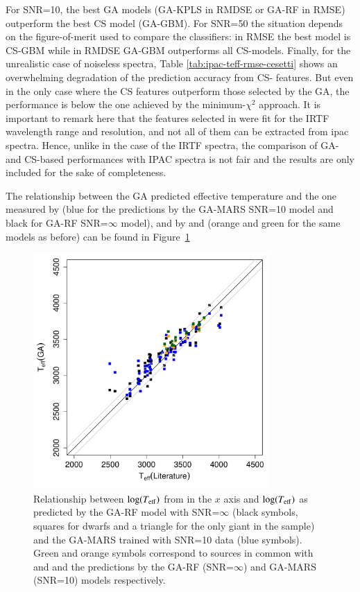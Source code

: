 For SNR=10, the best GA models (GA-KPLS in RMDSE or GA-RF in RMSE)
outperform the best CS model (GA-GBM). For SNR=50 the situation
depends on the figure-of-merit used to compare the classifiers: in
RMSE the best model is CS-GBM while in RMDSE GA-GBM outperforms all
CS-models. Finally, for the unrealistic case of noiseless spectra,
Table \ref{tab:ipac-teff-rmse-cesetti} shows an overwhelming
degradation of the prediction accuracy from CS- features. But even in
the only case where the CS features outperform those selected by the
GA, the performance is below the one achieved by the minimum-$\chi^2$
approach. It is important to remark here that the features selected
in \cite{cesetti} were fit for the IRTF wavelength range and
resolution, and not all of them can be extracted from ipac
spectra. Hence, unlike in the case of the IRTF spectra, the comparison
of GA- and CS-based performances with IPAC spectra is not fair and
the results are only included for the sake of completeness.

The relationship between the GA predicted effective temperature and
the one measured by \cite{RA2012} (blue for the predictions by the
GA-MARS SNR=10 model and black for GA-RF SNR=$\infty$ model), and
by \cite{esm1} and \cite{esm2} (orange and green for the same models
as before) can be found in Figure~\ref{fig:ipac_lt_lt}

\begin{figure}
 \begin{center} \includegraphics[width=9cm]{figs/ipac_LG_Trojas_Tknn_10.pdf}

\caption{Relationship  between $\log(T_{\rm eff})$ from \protect\cite{RA2012}
in the $x$ axis and $\log(T_{\rm eff})$ as predicted by the GA-RF
 model with SNR=$\infty$ (black symbols, squares for dwarfs and a
 triangle for the only giant in the sample) and the GA-MARS trained
 with SNR=10 data (blue symbols). Green and orange symbols correspond
 to sources in common with \protect\cite{esm1} and \protect\cite{esm2}
 and the predictions by the GA-RF (SNR=$\infty$) and GA-MARS (SNR=10)
 models respectively.} \label{fig:ipac_lt_lt} \end{center}
\end{figure}

